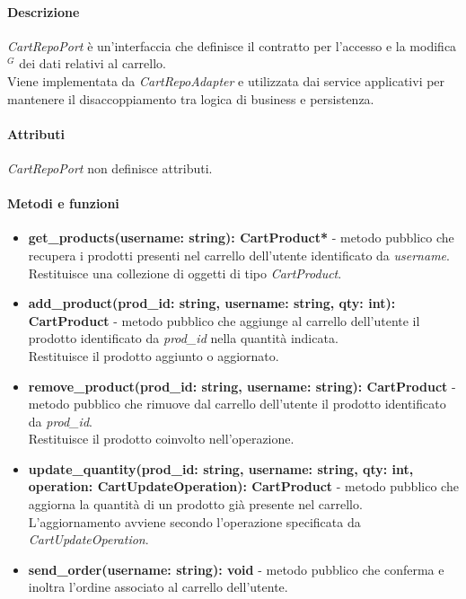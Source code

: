 \paragraph{Descrizione}
\textit{CartRepoPort} \`e un'interfaccia che definisce il contratto per l'accesso e la modifica$^G$ dei dati relativi al carrello.\\
Viene implementata da \textit{CartRepoAdapter} e utilizzata dai service applicativi per mantenere il disaccoppiamento tra logica di business e persistenza.

\paragraph{Attributi}
\textit{CartRepoPort} non definisce attributi.

\paragraph{Metodi e funzioni}
\begin{itemize}
	\item \textbf{get\_products(username: string): CartProduct*} - metodo pubblico che recupera i prodotti presenti nel carrello dell'utente identificato da \textit{username}.\\
	Restituisce una collezione di oggetti di tipo \textit{CartProduct}.
	\item \textbf{add\_product(prod\_id: string, username: string, qty: int): CartProduct} - metodo pubblico che aggiunge al carrello dell'utente il prodotto identificato da \textit{prod\_id} nella quantit\`a indicata.\\
	Restituisce il prodotto aggiunto o aggiornato.
	\item \textbf{remove\_product(prod\_id: string, username: string): CartProduct} - metodo pubblico che rimuove dal carrello dell'utente il prodotto identificato da \textit{prod\_id}.\\
	Restituisce il prodotto coinvolto nell'operazione.
	\item \textbf{update\_quantity(prod\_id: string, username: string, qty: int, operation: CartUpdateOperation): CartProduct} - metodo pubblico che aggiorna la quantit\`a di un prodotto gi\`a presente nel carrello.\\
	L'aggiornamento avviene secondo l'operazione specificata da \textit{CartUpdateOperation}.
	\item \textbf{send\_order(username: string): void} - metodo pubblico che conferma e inoltra l'ordine associato al carrello dell'utente.
\end{itemize}

